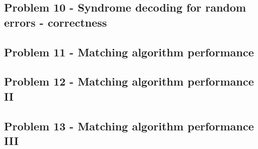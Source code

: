 \newpage
\subsection{Problem 10 - Syndrome decoding for random errors - correctness}




\newpage
\subsection{Problem 11 - Matching algorithm performance}




\newpage
\subsection{Problem 12 - Matching algorithm performance II}




\newpage
\subsection{Problem 13 - Matching algorithm performance III}